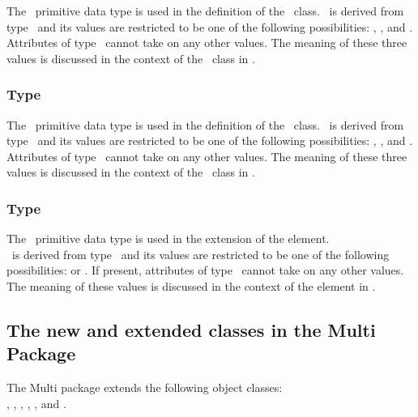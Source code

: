 The \BindingStatusPT\ primitive data type is used in the definition of the \OutwardBindingSite\ class.  \BindingStatusPT\ is derived from type \stringPT\ and its values are restricted to be one of the following possibilities: , , and .  Attributes of type \BindingStatusPT\ cannot take on any other values.  The meaning of these three values is discussed in the context of the \OutwardBindingSite\ class in .

\subsubsection{Type \RelationPT}
\label{def:Primtype:Relation}

The \RelationPT\ primitive data type is used in the definition of the \SubListOfSpeciesFeatures\ class. \RelationPT\ is derived from type \stringPT\ and its values are restricted to be one of the following possibilities: , , and . Attributes of type \RelationPT\ cannot take on any other values. The meaning of these three values is discussed in the context of the \SubListOfSpeciesFeatures\ class in .

\subsubsection{Type \RepresentationTypePT}
\label{def:Primtype:RepresentationType}

The \RepresentationTypePT\ primitive data type is used in the extension of the  element.\\ \RepresentationTypePT\ is derived from type \stringPT\ and its values are restricted to be one of the following possibi\-lities:  or . If present, attributes of type \RepresentationTypePT\ cannot take on any other values. The meaning of these values is discussed in the context of the   element in .

\subsection{The new and extended classes in the Multi Package}
\label{def:NewClasses}

The Multi package \mBlockChangedBegin{\revTwentyTwentyMarch} extends the following object classes:\mBlockChangedEnd{\revTwentyTwentyMarch} \\ 
\ExModel, \ExCompartment, \ExSpecies, \ExReaction, \ExSimpleSpeciesReference, and \ExSpeciesReference.  

